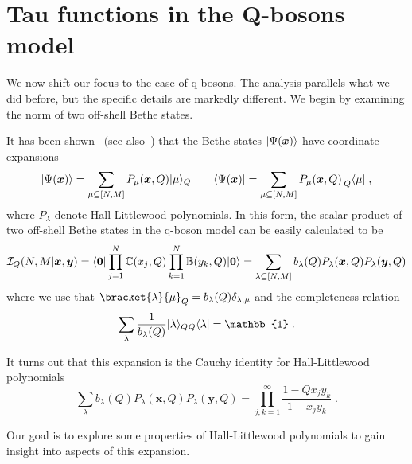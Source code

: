 \documentclass[a4paper,11pt]{amsart}
\begin{document}
\section{Tau functions in the Q-bosons model}

We now shift our focus to the case of q-bosons. The analysis parallels
what we did before, but the specific details are markedly
different. We begin by examining the norm of two off-shell Bethe
states.

It has been shown~\cite{Tsilevich:2006} (see
also~\cite{Sulkowski:2008mx, Wheeler:2010vmq}) that the Bethe states
\(\lvert\Psi(\bm{x})\rangle\) have coordinate expansions
\begin{equation}
  \lvert\Psi(\bm{x})\rangle = \sum_{\mu \subseteq [N,M]} P_\mu(\bm{x}, Q) \lvert\mu\rangle_Q  \qquad 
  \langle\Psi(\bm{x})\rvert = \sum_{\mu \subseteq [N,M]} P_\mu(\bm{x}, Q) \prescript{}{Q}{\langle\mu\rvert}\; ,
\end{equation}
where \(P_\lambda\) denote Hall-Littlewood polynomials. In this form,
the scalar product of two off-shell Bethe states in the q-boson model
can be easily calculated to be
\begin{equation}
\label{eq:scalar-hl}
\mathcal{I}_Q(N,M | \bm{x}, \bm{y}) = \langle\bm{0}\rvert \prod_{j=1}^N \mathbb{C}(x_j, Q)
\prod_{k=1}^N \mathbb{B}(y_k, Q) \lvert\bm{0}\rangle
= \sum_{\lambda \subseteq [N,M]} b_\lambda(Q) P_{\lambda}(\bm{x}, Q) P_{\lambda}(\bm{y}, Q)
\end{equation}
where we use that \(\bracket{\lambda}{\mu}_Q = b_\lambda(Q)
\delta_{\lambda, \mu}\) and the completeness relation
\begin{equation}
  \sum_{\lambda} \frac{1}{b_\lambda(Q)} \ket{\lambda}_Q {}_Q\bra{\lambda}  = \mathbb{1}\; .
\end{equation}

It turns out that this expansion is the Cauchy identity for
Hall-Littlewood polynomials~\cite{Macdonald:1998}
\begin{equation}
\label{eq:cauchy_hl}
\sum_{\lambda} b_\lambda(Q) P_{\lambda}(\bm{x}, Q) P_{\lambda}(\bm{y}, Q)
= \prod_{j, k=1}^\infty \frac{1-Q x_j y_k}{1 - x_j y_k}\; .
\end{equation}

Our goal is to explore some properties of Hall-Littlewood polynomials
to gain insight into aspects of this expansion.

\end{document}
